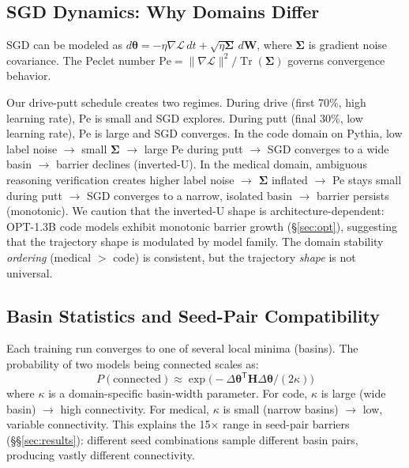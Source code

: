 \documentclass[11pt,a4paper]{article}
\begin{document}
\subsection{SGD Dynamics: Why Domains Differ}

SGD can be modeled as $d\bm{\theta} = -\eta \nabla\mathcal{L}\,dt + \sqrt{\eta \bm{\Sigma}}\,d\mathbf{W}$, where $\bm{\Sigma}$ is gradient noise covariance. The Peclet number $\text{Pe} = \|\nabla\mathcal{L}\|^2 / \operatorname{Tr}(\bm{\Sigma})$ governs convergence behavior.

Our drive-putt schedule creates two regimes. During drive (first 70\%, high learning rate), Pe is small and SGD explores. During putt (final 30\%, low learning rate), Pe is large and SGD converges. In the code domain on Pythia, low label noise $\rightarrow$ small $\bm{\Sigma}$ $\rightarrow$ large Pe during putt $\rightarrow$ SGD converges to a wide basin $\rightarrow$ barrier declines (inverted-U). In the medical domain, ambiguous reasoning verification creates higher label noise $\rightarrow$ $\bm{\Sigma}$ inflated $\rightarrow$ Pe stays small during putt $\rightarrow$ SGD converges to a narrow, isolated basin $\rightarrow$ barrier persists (monotonic). We caution that the inverted-U shape is architecture-dependent: OPT-1.3B code models exhibit monotonic barrier growth (\S\ref{sec:opt}), suggesting that the trajectory shape is modulated by model family. The domain stability \emph{ordering} (medical $>$ code) is consistent, but the trajectory \emph{shape} is not universal.

\subsection{Basin Statistics and Seed-Pair Compatibility}

Each training run converges to one of several local minima (basins). The probability of two models being connected scales as:
\begin{equation}
P(\text{connected}) \approx \exp\!\bigl(-\Delta\bm{\theta}^{\mathsf{T}}\mathbf{H}\Delta\bm{\theta} / (2\kappa)\bigr)
\label{eq:basin_prob}
\end{equation}
where $\kappa$ is a domain-specific basin-width parameter. For code, $\kappa$ is large (wide basin) $\rightarrow$ high connectivity. For medical, $\kappa$ is small (narrow basins) $\rightarrow$ low, variable connectivity. This explains the 15$\times$ range in seed-pair barriers (\S\S\ref{sec:results}): different seed combinations sample different basin pairs, producing vastly different connectivity.
\end{document}
